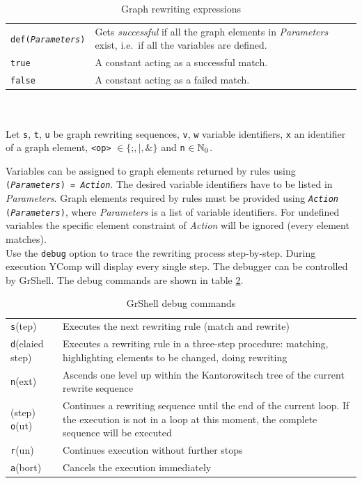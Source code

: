 \documentclass[a4paper,11pt]{report}
\begin{document}
\begin{table}[htbp]
\begin{tabularx}{\linewidth}{|lX|}
\texttt{def(\emph{Parameters})} & Gets \emph{successful} if all the graph elements in \emph{Parameters} exist, i.e.\ if all the variables are defined.\\
\texttt{true}	& A constant acting as a successful match.\\
\texttt{false}	& A constant acting as a failed match.\\ \hline
\end{tabularx}\\
\\ \centering
{\small Let \texttt{s}, \texttt{t}, \texttt{u} be graph rewriting sequences, \texttt{v}, \texttt{w} variable identifiers, \texttt{x} an identifier of a graph element, \texttt{<op>} $\in \{\texttt{;}, \texttt{|}, \texttt{\&}\}$ and \texttt{n} $\in \mathbb{N}_0$.}
\caption{Graph rewriting expressions}
\label{ruletab}
\end{table}
\makeatother

Variables can be assigned to graph elements returned by rules using \texttt{(\emph{Para\-meters}) = \emph{Action}}. The desired variable identifiers have to be listed in \emph{Parameters}. Graph elements required by rules must be provided using \texttt{\emph{Action} (\emph{Para\-meters})}, where \emph{Parameters} is a list of variable identifiers. For undefined variables the specific element constraint of \emph{Action} will be ignored (every element matches).\\

Use the \texttt{debug} option to trace the rewriting process step-by-step. During execution YComp will display every single step. The debugger can be controlled by GrShell. The debug commands are shown in table \ref{tabdebug}.
\begin{table}[htbp]
  \begin{tabularx}{\linewidth}{|lX|} \hline
  \texttt{s}(tep) & Executes the next rewriting rule (match and rewrite)\\
  \texttt{d}(elaied step) & Executes a rewriting rule in a three-step procedure: matching, highlighting elements to be changed, doing rewriting \\
  \texttt{n}(ext) & Ascends one level up within the Kantorowitsch tree of the current rewrite sequence\\
  (step) \texttt{o}(ut) & Continues a rewriting sequence until the end of the current loop. If the execution is not in a loop at this moment, the complete sequence will be executed\\
  \texttt{r}(un) &  Continues execution without further stops\\
  \texttt{a}(bort) & Cancels the execution immediately\\ \hline 
  \end{tabularx}
  \caption{GrShell debug commands}
  \label{tabdebug}
\end{table}
\end{document}

